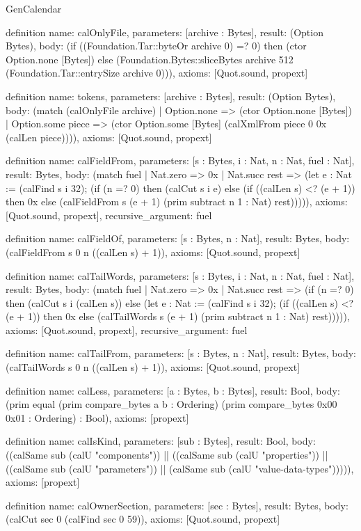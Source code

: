 \begin{lexlean}{GenCalendar}
\begin{semanticmodule}
definition{
  name: calOnlyFile,
  parameters: [archive : Bytes],
  result: (Option Bytes),
  body: (if ((Foundation.Tar::byteOr archive 0) =? 0) then (ctor Option.none [Bytes]) else (Foundation.Bytes::sliceBytes archive 512 (Foundation.Tar::entrySize archive 0))),
  axioms: [Quot.sound, propext]
}

definition{
  name: tokens,
  parameters: [archive : Bytes],
  result: (Option Bytes),
  body: (match (calOnlyFile archive)
    | Option.none => (ctor Option.none [Bytes])
    | Option.some piece => (ctor Option.some [Bytes] (calXmlFrom piece 0 0x (calLen piece)))),
  axioms: [Quot.sound, propext]
}

definition{
  name: calFieldFrom,
  parameters: [s : Bytes, i : Nat, n : Nat, fuel : Nat],
  result: Bytes,
  body: (match fuel
    | Nat.zero => 0x
    | Nat.succ rest => (let e : Nat := (calFind s i 32); (if (n =? 0) then (calCut s i e) else (if ((calLen s) <? (e + 1)) then 0x else (calFieldFrom s (e + 1) (prim subtract n 1 : Nat) rest))))),
  axioms: [Quot.sound, propext],
  recursive_argument: fuel
}

definition{
  name: calFieldOf,
  parameters: [s : Bytes, n : Nat],
  result: Bytes,
  body: (calFieldFrom s 0 n ((calLen s) + 1)),
  axioms: [Quot.sound, propext]
}

definition{
  name: calTailWords,
  parameters: [s : Bytes, i : Nat, n : Nat, fuel : Nat],
  result: Bytes,
  body: (match fuel
    | Nat.zero => 0x
    | Nat.succ rest => (if (n =? 0) then (calCut s i (calLen s)) else (let e : Nat := (calFind s i 32); (if ((calLen s) <? (e + 1)) then 0x else (calTailWords s (e + 1) (prim subtract n 1 : Nat) rest))))),
  axioms: [Quot.sound, propext],
  recursive_argument: fuel
}

definition{
  name: calTailFrom,
  parameters: [s : Bytes, n : Nat],
  result: Bytes,
  body: (calTailWords s 0 n ((calLen s) + 1)),
  axioms: [Quot.sound, propext]
}

definition{
  name: calLess,
  parameters: [a : Bytes, b : Bytes],
  result: Bool,
  body: (prim equal (prim compare_bytes a b : Ordering) (prim compare_bytes 0x00 0x01 : Ordering) : Bool),
  axioms: [propext]
}

definition{
  name: calIsKind,
  parameters: [sub : Bytes],
  result: Bool,
  body: ((calSame sub (calU "components")) || ((calSame sub (calU "properties")) || ((calSame sub (calU "parameters")) || (calSame sub (calU "value-data-types"))))),
  axioms: [propext]
}

definition{
  name: calOwnerSection,
  parameters: [sec : Bytes],
  result: Bytes,
  body: (calCut sec 0 (calFind sec 0 59)),
  axioms: [Quot.sound, propext]
}


\end{semanticmodule}
\end{lexlean}
